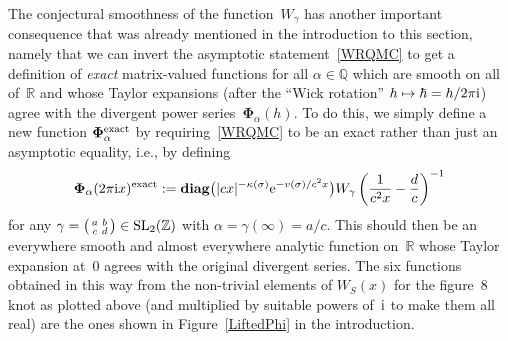 \documentclass[pdftex]{sigma}
\numberwithin{equation}{section}
\def\k{\kappa}
\def\SL{\mathrm{SL}}
\def\a{\alpha}
\def\R{\mathbb R}
\def\Z{\mathbb Z}
\def\Q{\mathbb Q}
\def\i{^{-1}}
\def\a{\alpha}
\def\s{\sigma}
\def\sma#1#2#3#4{\bigl(\smallmatrix#1&#2\\#3&#4\endsmallmatrix\bigr)} %
\def\be{\begin{equation}}
\def\ee{\end{equation}}
\def\g{\gamma}
\def\diag{\operatorname{\mathbf{diag}}} %
\def\bPhi{\mathbf\Phi}
\def\EXACT{^{\text{\rm exact}}}
\begin{document}
The conjectural smoothness of the function~$W_\g$ has another important consequence
that was already mentioned in the introduction to this section, namely that we can
invert the asymptotic statement~\eqref{WRQMC} to get a definition of \emph{exact}
matrix-valued functions for all \hbox{$\a\in\Q$} which are smooth on all of~$\R$ and
whose Taylor expansions (after the ``Wick rotation'' \hbox{$h\mapsto\hbar=h/2\pi {\rm i}$})
agree with the divergent power series~$\bPhi_\a(h)$. To do this, we simply define a
new function $\bPhi_\a\EXACT$ by requiring~\eqref{WRQMC} to be an exact rather than
just an asymptotic equality, i.e., by defining
\be
\label{PhiExact}
\bPhi_\a(2\pi {\rm i}x)\EXACT := \diag\bigl(|cx|^{-\k(\s)}{\rm e}^{-v(\s)/c^2x}\bigl)
 W_\g\left(\frac1{c^2x}-\frac dc\right)\i
\ee
for any $\g=\sma abcd \in\SL_2(\Z)$ with $\a=\g(\infty)=a/c$.
This should then be an everywhere smooth and almost everywhere analytic function
on~$\R$ whose Taylor expansion at~0 agrees with the original divergent series. The
six functions obtained in this way from the non-trivial elements of $W_S(x)$ for the
figure~8 knot as plotted above (and multiplied by suitable powers of~${\rm i}$ to make them
all real) are the ones shown in Figure~\ref{LiftedPhi} in the introduction.
\end{document}
